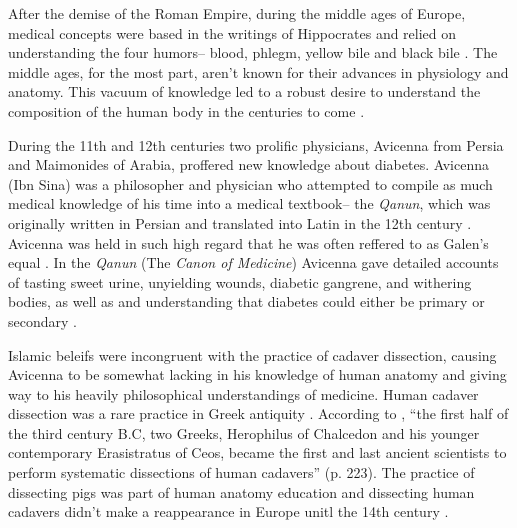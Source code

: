 \documentclass[12pt]{article}
\begin{document}
After the demise of the Roman Empire, during the middle ages of Europe, medical concepts were based in the writings of Hippocrates and relied on understanding the four humors-- blood, phlegm, yellow bile and black bile \citep{lloyd_1983_hippocratic}. The middle ages, for the most part, aren't known for their advances in physiology and anatomy. This vacuum of knowledge led to a robust desire to understand the composition of the human body in the centuries to come \citep{sanders_2001_philatelic}. 

During the 11th and 12th centuries two prolific physicians, Avicenna from Persia and Maimonides of Arabia, proffered new knowledge about diabetes. Avicenna (Ibn Sina) was a philosopher and physician who attempted to compile as much medical knowledge of his time into a medical textbook-- the \textit{Qanun}, which was originally written in Persian and translated into Latin in the 12th century \citep{avicenna_1930_treatise}. Avicenna was held in such high regard that he was often reffered to as Galen's equal \citep{sanders_2001_philatelic}. In the \textit{Qanun} (The \textit{Canon of Medicine}) Avicenna gave detailed accounts of tasting sweet urine, unyielding wounds, diabetic gangrene, and withering bodies, as well as and understanding that diabetes could either be primary or secondary \citep{avicenna_1930_treatise}. 

Islamic beleifs were incongruent with the practice of cadaver dissection, causing Avicenna to be somewhat lacking in his knowledge of human anatomy and giving way to his heavily philosophical understandings of medicine. Human cadaver dissection was a rare practice in Greek antiquity \citep{sanders_2001_diabetes}. According to \citet{von_1992_discovery}, ``the first half of the third century B.C, two Greeks, Herophilus of Chalcedon and his younger contemporary Erasistratus of Ceos, became the first and last ancient scientists to perform systematic dissections of human cadavers'' (p. 223). The practice of dissecting pigs was part of human anatomy education and dissecting human cadavers didn't make a reappearance in Europe unitl the 14th century \citep{von_1992_discovery}. 
\end{document}
